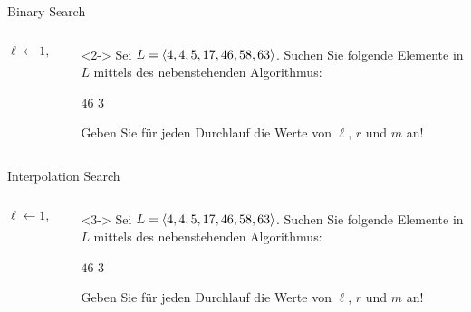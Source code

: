 \begin{frame}{Binary Search}
\begin{columns}[T,onlytextwidth]
\begin{column}{0.42\textwidth}
\begin{algorithm}[H]
	\caption{Binary Search}
	\label{search:alg:binsearch}
	\DontPrintSemicolon
    $\ell \gets 1, \quad r \gets n$\;
    \Return{\False}
\end{algorithm}
\end{column}
\begin{column}{0.53\textwidth}
\begin{task}<2->
Sei $L = \langle4, 4, 5, 17, 46, 58, 63\rangle$.
Suchen Sie folgende Elemente in $L$ mittels des nebenstehenden Algorithmus:
\begin{tasks}
    \task $46$
    \task $3$
\end{tasks}
Geben Sie f\"ur jeden Durchlauf die Werte von $\ell$, $r$ und $m$ an!
\end{task}
\end{column}
\end{columns}
\end{frame}

\begin{frame}{Interpolation Search}
\begin{columns}[T,onlytextwidth]
\begin{column}{0.45\textwidth}
\begin{algorithm}[H]
	\caption{Interpolation Search}
	\label{search:alg:intsearch}
	\DontPrintSemicolon
    $\ell \gets 1, \quad r \gets n$\;
    \Return{\False}
\end{algorithm}
\end{column}
\begin{column}{0.5\textwidth}
\begin{task}<3->
Sei $L = \langle4, 4, 5, 17, 46, 58, 63\rangle$.
Suchen Sie folgende Elemente in $L$ mittels des nebenstehenden Algorithmus:
\begin{tasks}
    \task $46$
    \task $3$
\end{tasks}
Geben Sie f\"ur jeden Durchlauf die Werte von $\ell$, $r$ und $m$ an!
\end{task}
\end{column}
\end{columns}
\end{frame}

